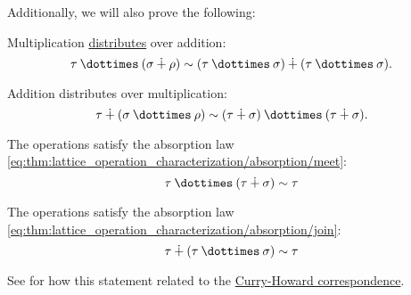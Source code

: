\begin{proposition}
  Additionally, we will also prove the following:
  \begin{thmenum}[resume=thm:simple_algebraic_type_arithmetic]
     Multiplication \hyperref[def:semiring]{distributes} over addition:
    \begin{equation}\label{eq:thm:simple_algebraic_type_arithmetic/multiplication_distributes}
      \tau \syntimes (\sigma \synplus \rho) \sim (\tau \syntimes \sigma) \synplus (\tau \syntimes \sigma).
    \end{equation}

     Addition distributes over multiplication:
    \begin{equation}\label{eq:thm:simple_algebraic_type_arithmetic/addition_distributes}
      \tau \synplus (\sigma \syntimes \rho) \sim (\tau \synplus \sigma) \syntimes (\tau \synplus \sigma).
    \end{equation}

     The operations satisfy the absorption law \eqref{eq:thm:lattice_operation_characterization/absorption/meet}:
    \begin{equation}\label{eq:thm:simple_algebraic_type_arithmetic/multiplication_absorbs}
      \tau \syntimes (\tau \synplus \sigma) \sim \tau
    \end{equation}

     The operations satisfy the absorption law \eqref{eq:thm:lattice_operation_characterization/absorption/join}:
    \begin{equation}\label{eq:thm:simple_algebraic_type_arithmetic/addition_absorbs}
      \tau \synplus (\tau \syntimes \sigma) \sim \tau
    \end{equation}
  \end{thmenum}
\end{proposition}
\begin{comments}
  \item See  for how this statement related to the \hyperref[con:curry_howard_correspondence]{Curry-Howard correspondence}.
\end{comments}

